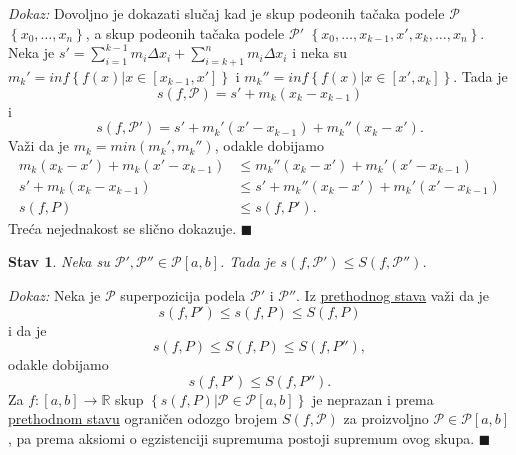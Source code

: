 \documentclass{article}
\newtheorem{stav}{Stav}[section]
\begin{document}
\textit{Dokaz:} Dovoljno je dokazati slučaj kad je skup podeonih tačaka podele $\mathcal{P}$
$\left\{x_0,\dotsc,x_n\right\}$, a skup podeonih tačaka podele $\mathcal{P}'$
$\left\{x_0,\dotsc,x_{k-1},x',x_k,\dotsc,x_n\right\}$. Neka je $\displaystyle s'=\sum_{i=1}^{k-1}m_i\Delta x_i+\sum_{i=k+1}^{n}m_i\Delta x_i$ i neka su
$m_k'=inf\left\{f\left(x\right)\big|x\in\left[x_{k-1},x'\right]\right\}$ i $m_k''=inf\left\{f\left(x\right)\big|x\in\left[x',x_k\right]\right\}$.
Tada je $$s\left(f,\mathcal{P}\right)=s'+m_k\left(x_k-x_{k-1}\right)$$
i
$$s\left(f,\mathcal{P}'\right)=s'+m_k'\left(x'-x_{k-1}\right)+m_k''\left(x_k-x'\right).$$
Važi da je $m_k=min\left(m_k',m_k''\right)$, odakle dobijamo
\begin{align*}
    m_k\left(x_k-x'\right)+m_k\left(x'-x_{k-1}\right) & \leq m_k''\left(x_k-x'\right)+m_k'\left(x'-x_{k-1}\right)    \\
    s'+m_k\left(x_k-x_{k-1}\right)                    & \leq s'+m_k''\left(x_k-x'\right)+m_k'\left(x'-x_{k-1}\right) \\
    s\left(f,P\right)                                 & \leq s\left(f,P'\right).
\end{align*}
Treća nejednakost se slično dokazuje.
\null\hfill $\blacksquare$\par

\begin{stavbox}
    \label{stav_2.2}
    \begin{stav}
        Neka su $\mathcal{P}',\mathcal{P}''\in\mathcal{P}\left[a,b\right]$. Tada je $s\left(f,\mathcal{P}'\right)\leq S\left(f,\mathcal{P}''\right)$.
    \end{stav}
\end{stavbox}

\textit{Dokaz:} Neka je $\mathcal{P}$ superpozicija podela $\mathcal{P}'$ i $\mathcal{P}''$. Iz
\hyperref[stav_2.1]{prethodnog stava} važi da je
$$s\left(f,P'\right)\leq s\left(f,P\right)\leq S\left(f,P\right)$$
i da je
$$s\left(f,P\right)\leq S\left(f,P\right)\leq S\left(f,P''\right),$$
odakle dobijamo
$$s\left(f,P'\right)\leq S\left(f,P''\right).$$
Za $f: \left[a,b\right]\longrightarrow\mathbb{R}$ skup $\left\{s\left(f,P\right)\big|\mathcal{P}\in\mathcal{P}\left[a,b\right]\right\}$
je neprazan i prema \hyperref[stav_2.2]{prethodnom stavu} ograničen odozgo brojem $S\left(f,\mathcal{P}\right)$ za proizvoljno $\mathcal{P}\in\mathcal{P}\left[a,b\right]$,
pa prema aksiomi o egzistenciji supremuma postoji supremum ovog
skupa.
\null\hfill $\blacksquare$\par
\end{document}
